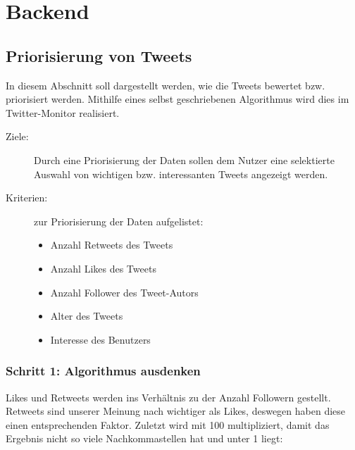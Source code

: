 \section{Backend}

\subsection{Priorisierung von Tweets}

In diesem Abschnitt soll dargestellt werden, wie die Tweets bewertet bzw. priorisiert 
werden. Mithilfe eines selbst geschriebenen Algorithmus wird dies im Twitter-Monitor 
realisiert. 
\begin{description}
	\item [Ziele:] Durch eine Priorisierung der Daten sollen dem Nutzer eine selektierte Auswahl von wichtigen bzw. interessanten Tweets angezeigt werden. 
	\item [Kriterien:] zur Priorisierung der Daten aufgelistet:
	\begin{itemize}
		\item Anzahl Retweets des Tweets 
		\item Anzahl Likes des Tweets
		\item Anzahl Follower des Tweet-Autors
		\item Alter des Tweets
		\item Interesse des Benutzers
	\end{itemize}
\end{description}

\subsubsection*{Schritt 1: Algorithmus ausdenken}

Likes und Retweets werden ins Verhältnis zu der Anzahl Followern gestellt. Retweets sind 
unserer Meinung nach wichtiger als Likes, deswegen haben diese einen entsprechenden 
Faktor. Zuletzt wird mit 100 multipliziert, damit das Ergebnis nicht so viele 
Nachkommastellen hat und unter 1 liegt:
 
